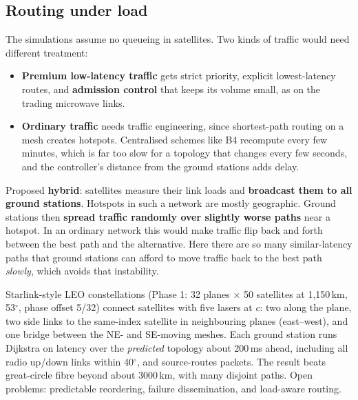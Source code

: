 \subsection{Routing under load}
The simulations assume no queueing in satellites. Two kinds of traffic would need different treatment:
\begin{itemize}
  \item \textbf{Premium low-latency traffic} gets strict priority, explicit lowest-latency routes, and \textbf{admission control} that keeps its volume small, as on the trading
        microwave links.
  \item \textbf{Ordinary traffic} needs traffic engineering, since shortest-path routing on a mesh creates hotspots. Centralised schemes like B4 recompute every few minutes,
        which is far too slow for a topology that changes every few seconds, and the controller's distance from the ground stations adds delay.
\end{itemize}
Proposed \textbf{hybrid}: satellites measure their link loads and \textbf{broadcast them to all ground stations}. Hotspots in such a network are mostly geographic. Ground
stations then \textbf{spread traffic randomly over slightly worse paths} near a hotspot. In an ordinary network this would make traffic flip back and forth between the
best path and the alternative. Here there are so many similar-latency paths that ground stations can afford to move traffic back to the best path \emph{slowly}, which
avoids that instability.

\begin{keybox}
Starlink-style LEO constellations (Phase 1: 32 planes $\times$ 50 satellites at 1,150\,km, 53$^\circ$, phase offset 5/32) connect satellites with five lasers at
$c$: two along the plane, two side links to the same-index satellite in neighbouring planes (east--west), and one bridge between the NE- and SE-moving meshes.
Each ground station runs Dijkstra on latency over the \emph{predicted} topology about 200\,ms ahead, including all radio up/down links within 40$^\circ$, and
source-routes packets. The result beats great-circle fibre beyond about 3000\,km, with many disjoint paths. Open problems: predictable reordering, failure
dissemination, and load-aware routing.
\end{keybox}

